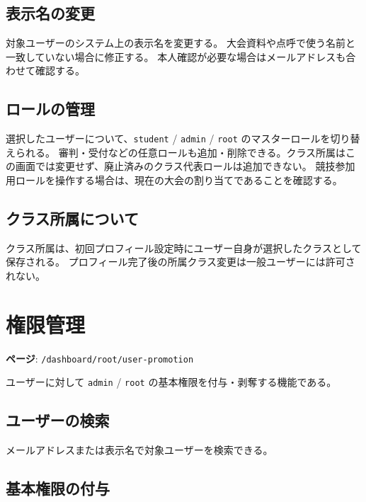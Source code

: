 \documentclass[12pt]{ltjsarticle}
\newcommand{\code}[1]{\colorbox{gray!20}{\texttt{#1}}}
\begin{document}
\subsection{表示名の変更}

対象ユーザーのシステム上の表示名を変更する。
大会資料や点呼で使う名前と一致していない場合に修正する。
本人確認が必要な場合はメールアドレスも合わせて確認する。

\subsection{ロールの管理}

選択したユーザーについて、\code{student} / \code{admin} / \code{root} のマスターロールを切り替えられる。
審判・受付などの任意ロールも追加・削除できる。クラス所属はこの画面では変更せず、廃止済みのクラス代表ロールは追加できない。
競技参加用ロールを操作する場合は、現在の大会の割り当てであることを確認する。

\subsection{クラス所属について}

クラス所属は、初回プロフィール設定時にユーザー自身が選択したクラスとして保存される。
プロフィール完了後の所属クラス変更は一般ユーザーには許可されない。

\newpage

\section{権限管理}

\textbf{ページ}: \code{/dashboard/root/user-promotion}

ユーザーに対して \code{admin} / \code{root} の基本権限を付与・剥奪する機能である。

\subsection{ユーザーの検索}

メールアドレスまたは表示名で対象ユーザーを検索できる。

\subsection{基本権限の付与}
\end{document}

